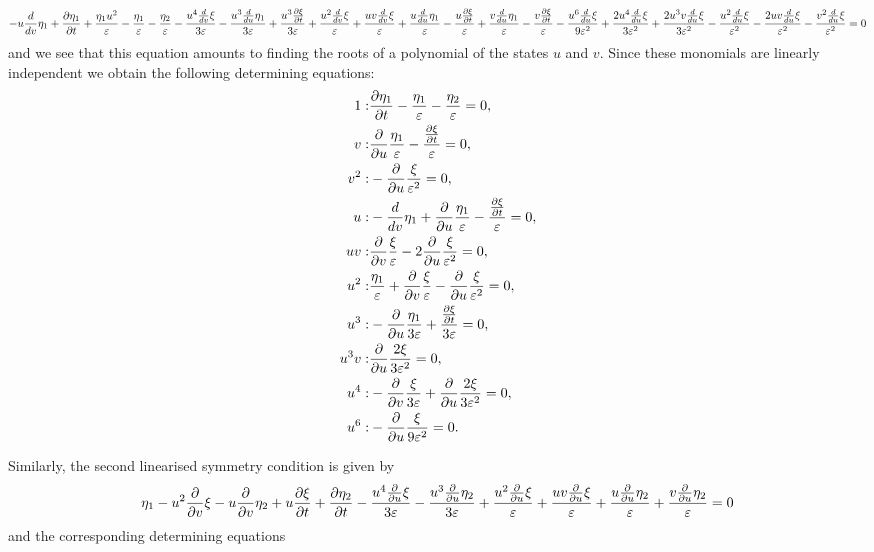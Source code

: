 \begin{align}
- u \frac{d}{d v} \eta_1 + \pdv{\eta_1}{t} + \frac{\eta_1 u^{2}}{\varepsilon} - \frac{\eta_1}{\varepsilon} - \frac{\eta_2}{\varepsilon} - \frac{u^{4} \frac{d}{d v} \xi}{3 \varepsilon} - \frac{u^{3} \frac{d}{d u} \eta_1}{3 \varepsilon} + \frac{u^{3} \pdv{\xi}{t}}{3 \varepsilon} + \frac{u^{2} \frac{d}{d v} \xi}{\varepsilon} + \frac{u v \frac{d}{d v} \xi}{\varepsilon} + \frac{u \frac{d}{d u} \eta_1}{\varepsilon} - \frac{u \pdv{\xi}{t}}{\varepsilon} + \frac{v \frac{d}{d u} \eta_1}{\varepsilon} - \frac{v\pdv{\xi}{t}}{\varepsilon} - \frac{u^{6} \frac{d}{d u} \xi}{9 \varepsilon^{2}} + \frac{2 u^{4} \frac{d}{d u} \xi}{3 \varepsilon^{2}} + \frac{2 u^{3} v \frac{d}{d u} \xi}{3 \varepsilon^{2}} - \frac{u^{2} \frac{d}{d u} \xi}{\varepsilon^{2}} - \frac{2 u v \frac{d}{d u} \xi}{\varepsilon^{2}} - \frac{v^{2} \frac{d}{d u} \xi}{\varepsilon^{2}}&=0\\
\end{align}
and we see that this equation amounts to finding the roots of a polynomial of the states $u$ and $v$. Since these monomials are linearly independent we obtain the following determining equations:
\begin{align}
  1:&\pdv{\eta_1}{t} - \frac{\eta_1}{\varepsilon} - \frac{\eta_2}{\varepsilon}=0,\\
  v:&\pdv{}{u} \frac{\eta_1}{\varepsilon} - \frac{\pdv{\xi}{t}}{\varepsilon}=0,\\
  v^{2}:&- \pdv{}{u} \frac{\xi}{\varepsilon^{2}}=0,\\
  u:&- \frac{d}{d v} \eta_1 + \pdv{}{u} \frac{\eta_1}{\varepsilon} - \frac{\pdv{\xi}{t}}{\varepsilon}=0,\\  
  u v:&\pdv{}{v} \frac{\xi}{\varepsilon} - 2 \pdv{}{u} \frac{\xi}{\varepsilon^{2}}=0,\\
  u^{2}:&\frac{\eta_1}{\varepsilon} + \pdv{}{v} \frac{\xi}{\varepsilon} - \pdv{}{u} \frac{\xi}{\varepsilon^{2}}=0,\\
  u^{3}:&- \pdv{}{u} \frac{\eta_1}{3 \varepsilon} + \frac{\pdv{\xi}{t}}{3 \varepsilon}=0,\\
u^{3} v:&\pdv{}{u}\frac{2  \xi}{3 \varepsilon^{2}}=0,\\
 u^{4}:&- \pdv{}{v}\frac{\xi}{3 \varepsilon} + \pdv{}{u}\frac{2 \xi}{3 \varepsilon^{2}}=0,\\
 u^{6}:&- \pdv{}{u} \frac{\xi}{9 \varepsilon^{2}}=0.\\
\end{align}

Similarly, the second linearised symmetry condition is given by
\begin{align}
\eta_1 - u^{2} \pdv{}{v} \xi - u \pdv{}{v} \eta_2 + u \pdv{\xi}{t} + \pdv{\eta_2}{t} - \frac{u^{4} \pdv{}{u} \xi}{3 \varepsilon} - \frac{u^{3} \pdv{}{u} \eta_2}{3 \varepsilon} + \frac{u^{2} \pdv{}{u} \xi}{\varepsilon} + \frac{u v \pdv{}{u} \xi}{\varepsilon} + \frac{u \pdv{}{u} \eta_2}{\varepsilon} + \frac{v \pdv{}{u} \eta_2}{\varepsilon}&=0\\
\end{align}
and the corresponding determining equations

